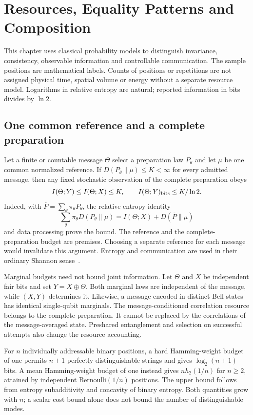 \section{Resources, Equality Patterns and Composition}
\label{pat:chapter}

This chapter uses classical probability models to distinguish invariance, consistency, observable information and controllable communication. The sample positions are mathematical labels. Counts of positions or repetitions are not assigned physical time, spatial volume or energy without a separate resource model. Logarithms in relative entropy are natural; reported information in bits divides by $\ln2$.

\subsection{One common reference and a complete preparation}
\label{pat:reference}
Let a finite or countable message $\Theta$ select a preparation law $P_\theta$ and let $\mu$ be one common normalized reference. If $D(P_\theta\|\mu)\le K<\infty$ for every admitted message, then any fixed stochastic observation of the complete preparation obeys
\[
 I(\Theta;Y)\le I(\Theta;X)\le K,\qquad
 I(\Theta;Y)_{\rm bits}\le K/\ln2.
\]
Indeed, with $\overline P=\sum_\theta\pi_\theta P_\theta$, the relative-entropy identity
\[
 \sum_\theta\pi_\theta D(P_\theta\|\mu)
 =I(\Theta;X)+D(\overline P\|\mu)
\]
and data processing prove the bound. The reference and the complete-preparation budget are premises. Choosing a separate reference for each message would invalidate this argument. Entropy and communication are used in their ordinary Shannon sense~\cite{shannon}.

Marginal budgets need not bound joint information. Let $\Theta$ and $X$ be independent fair bits and set $Y=X\oplus\Theta$. Both marginal laws are independent of the message, while $(X,Y)$ determines it. Likewise, a message encoded in distinct Bell states has identical single-qubit marginals. The message-conditioned correlation resource belongs to the complete preparation. It cannot be replaced by the correlations of the message-averaged state. Preshared entanglement and selection on successful attempts also change the resource accounting.

For $n$ individually addressable binary positions, a hard Hamming-weight budget of one permits $n+1$ perfectly distinguishable strings and gives $\log_2(n+1)$ bits. A mean Hamming-weight budget of one instead gives $n h_2(1/n)$ for $n\ge2$, attained by independent Bernoulli$(1/n)$ positions. The upper bound follows from entropy subadditivity and concavity of binary entropy. Both quantities grow with $n$; a scalar cost bound alone does not bound the number of distinguishable modes.

